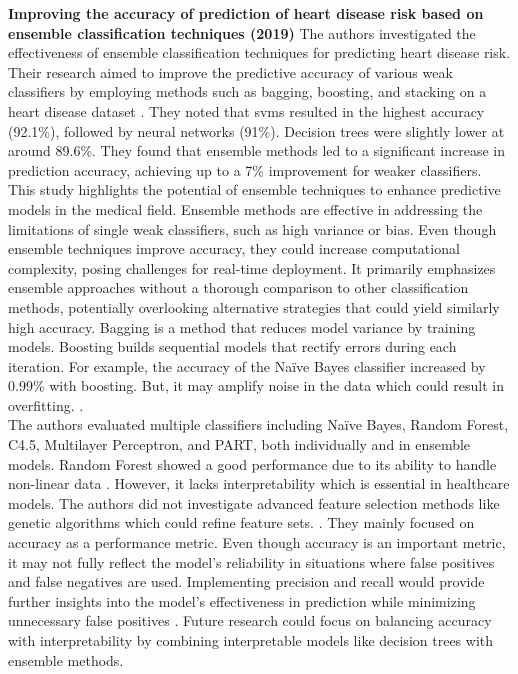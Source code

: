 \noindent \textbf{Improving the accuracy of prediction of heart disease risk based on ensemble classification techniques (2019) }
The authors investigated the effectiveness of ensemble classification techniques for predicting heart disease risk. Their research aimed to improve the predictive accuracy of various weak classifiers by employing methods such as bagging, boosting, and stacking on a heart disease dataset \cite{latha2019improving}. They noted that \gls{svm}s resulted in the highest accuracy (92.1\%), followed by neural networks (91\%). Decision trees were slightly lower at around 89.6\%. They found that ensemble methods led to a significant increase in prediction accuracy, achieving up to a 7\% improvement for weaker classifiers. This study highlights the potential of ensemble techniques to enhance predictive models in the medical field. Ensemble methods are effective in addressing the limitations of single weak classifiers, such as high variance or bias. Even though ensemble techniques improve accuracy, they could increase computational complexity, posing challenges for real-time deployment.  It primarily emphasizes ensemble approaches without a thorough comparison to other classification methods, potentially overlooking alternative strategies that could yield similarly high accuracy. Bagging is a method that reduces model variance by training models. Boosting builds sequential models that rectify errors during each iteration. For example, the accuracy of the Naïve Bayes classifier increased by 0.99\% with boosting. But, it may amplify noise in the data which could result in overfitting. \citep{chen2016xgboost}. \\ 
The authors evaluated multiple classifiers including Naïve Bayes, Random Forest, C4.5, Multilayer Perceptron, and PART, both individually and in ensemble models. Random Forest showed a good performance due to its ability to handle non-linear data  \citep{breiman2001random}.  However, it lacks interpretability which is essential in healthcare models\citep{rudin2019stop}. The authors did not investigate advanced feature selection methods like genetic algorithms which could refine feature sets. \cite{guyon2002feature}. They mainly focused on accuracy as a performance metric. Even though accuracy is an important metric, it may not fully reflect the model’s reliability in situations where false positives and false negatives are used. Implementing precision and recall would provide further insights into the model’s effectiveness in prediction while minimizing unnecessary false positives \citep{davis2006relationship}. Future research could focus on balancing accuracy with interpretability by combining interpretable models like decision trees with ensemble methods.
\vspace{0.5 cm}

